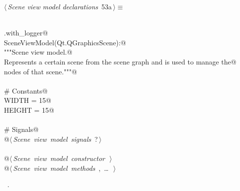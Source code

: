 \documentclass[
    a4paper,      %
    10pt,         %
    openright,    %
    notitlepage,  %
    parskip=half, %
]{scrreprt}       %
\theoremstyle{definition}                    %
\begin{document}
\begin{flushleft} \small
\begin{minipage}{\linewidth}\label{scrap80}\raggedright\small
{} $\langle\,${\itshape Scene view model declarations}\nobreak\ {\footnotesize {53a}}$\,\rangle\equiv$
\vspace{-1exm}
\begin{list}{}{} \item
\mbox{}\lstinline@@\\
\mbox{}\lstinline@common.with_logger@\\
\mbox{}\lstinline@class SceneViewModel(Qt.QGraphicsScene):@\\
\mbox{}\lstinline@    """Scene view model.@\\
\mbox{}\lstinline@    Represents a certain scene from the scene graph and is used to manage the@\\
\mbox{}\lstinline@    nodes of that scene."""@\\
\mbox{}\lstinline@@\\
\mbox{}\lstinline@    # Constants@\\
\mbox{}\lstinline@    WIDTH = 15@\\
\mbox{}\lstinline@    HEIGHT = 15@\\
\mbox{}\lstinline@@\\
\mbox{}\lstinline@    # Signals@\\
\mbox{}\lstinline@    @\hbox{$\langle\,${\itshape Scene view model signals}\nobreak\ {\footnotesize ?}$\,\rangle$}\lstinline@@\\
\mbox{}\lstinline@@\\
\mbox{}\lstinline@    @\hbox{$\langle\,${\itshape Scene view model constructor}\nobreak\ {\footnotesize {}}$\,\rangle$}\lstinline@@\\
\mbox{}\lstinline@    @\hbox{$\langle\,${\itshape Scene view model methods}\nobreak\ {\footnotesize {}, \ldots\ }$\,\rangle$}\lstinline@@\\
\mbox{}\lstinline@@{\NWsep}
\end{list}
\vspace{-1.5ex}
\footnotesize
\begin{list}{}{\setlength{\itemsep}{-\parsep}\setlength{\itemindent}{-\leftmargin}}
\item \NWtxtMacroRefIn\ .

\item{}
\end{list}
\end{minipage}\vspace{4ex}
\end{flushleft}
\end{document}
